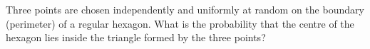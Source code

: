 Three points are chosen independently and uniformly at random on the boundary (perimeter) of a regular hexagon. What is the probability that the centre of the hexagon lies inside the triangle formed by the three points?
